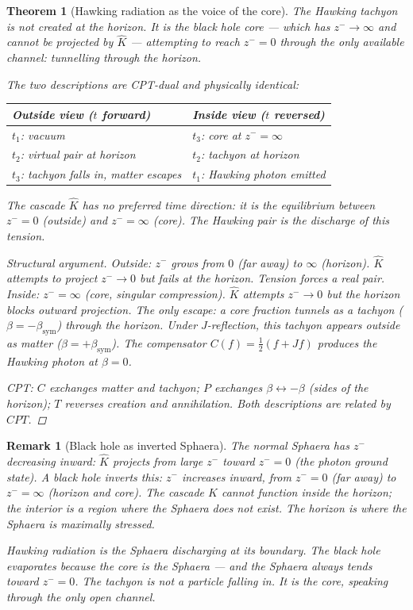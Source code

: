 \documentclass[12pt,a4paper]{article}
\newtheorem{theorem}{Theorem}[section]
\newtheorem*{remark}{Remark}
\newcommand{\bsym}{\beta_{\mathrm{sym}}}
\newcommand{\zminus}{z^-}
\newcommand{\KC}{\hat{K}}
\begin{document}
\begin{theorem}[Hawking radiation as the voice of the core]\label{thm:core}
The Hawking tachyon is not created at the horizon.
It is the black hole core --- which has $\zminus\to\infty$ and cannot
be projected by $\KC$ --- attempting to reach $\zminus=0$ through the
only available channel: tunnelling through the horizon.

The two descriptions are CPT-dual and physically identical:
\begin{center}
\renewcommand{\arraystretch}{1.2}
\begin{tabular}{ll}
\toprule
Outside view ($t$ forward) & Inside view ($t$ reversed)\\
\midrule
$t_1$: vacuum & $t_3$: core at $\zminus=\infty$\\
$t_2$: virtual pair at horizon & $t_2$: tachyon at horizon\\
$t_3$: tachyon falls in, matter escapes & $t_1$: Hawking photon emitted\\
\bottomrule
\end{tabular}
\end{center}
The cascade $\KC$ has no preferred time direction: it is the equilibrium
between $\zminus=0$ (outside) and $\zminus=\infty$ (core).
The Hawking pair is the discharge of this tension.

\begin{proof}[Structural argument]
Outside: $\zminus$ grows from $0$ (far away) to $\infty$ (horizon).
$\KC$ attempts to project $\zminus\to 0$ but fails at the horizon.
Tension forces a real pair.
Inside: $\zminus=\infty$ (core, singular compression).
$\KC$ attempts $\zminus\to 0$ but the horizon blocks outward projection.
The only escape: a core fraction tunnels as a tachyon
($\beta=-\bsym$) through the horizon.
Under $J$-reflection, this tachyon appears outside as matter
($\beta=+\bsym$).
The compensator $C(f)=\tfrac{1}{2}(f+Jf)$ produces the Hawking photon
at $\beta=0$.

CPT\@: $C$ exchanges matter and tachyon; $P$ exchanges $\beta\leftrightarrow-\beta$
(sides of the horizon); $T$ reverses creation and annihilation.
Both descriptions are related by $CPT$.
\end{proof}
\end{theorem}

\begin{remark}[Black hole as inverted Sphaera]
The normal Sphaera has $\zminus$ decreasing inward:
$\KC$ projects from large $\zminus$ toward $\zminus=0$
(the photon ground state).
A black hole inverts this: $\zminus$ increases inward, from
$\zminus=0$ (far away) to $\zminus=\infty$ (horizon and core).
The cascade $\KC$ cannot function inside the horizon; the interior is
a region where the Sphaera does not exist.
The horizon is where the Sphaera is maximally stressed.

Hawking radiation is the Sphaera discharging at its boundary.
The black hole evaporates because the core is the Sphaera --- and the
Sphaera always tends toward $\zminus=0$.
The tachyon is not a particle falling in. It is the core, speaking
through the only open channel.
\end{remark}
\end{document}
